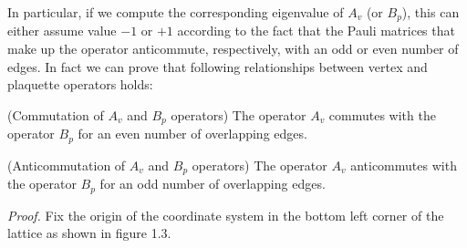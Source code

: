 \documentclass{Configuration_Files/PoliMi3i_thesis}
\begin{document}
In particular, if we compute the corresponding eigenvalue of $A_v$ (or $B_p$), this can either assume value $-1$ or $+1$ according to the fact that the Pauli matrices that make up the operator anticommute, respectively, with an odd or even number of edges.
In fact we can prove that following relationships between vertex and plaquette operators holds:

\begin{proposition} (Commutation of $A_v$ and $B_p$ operators) The operator $A_v$ commutes with the operator $B_p$ for an even number of overlapping edges.
\end{proposition}


\begin{proposition} (Anticommutation of $A_v$ and $B_p$ operators) The operator $A_v$ anticommutes with the operator $B_p$ for an odd number of overlapping edges.
\end{proposition}


\textit{Proof.}\newline 
Fix the origin of the coordinate system in the bottom left corner of the lattice as shown in figure 1.3. 
\end{document}
